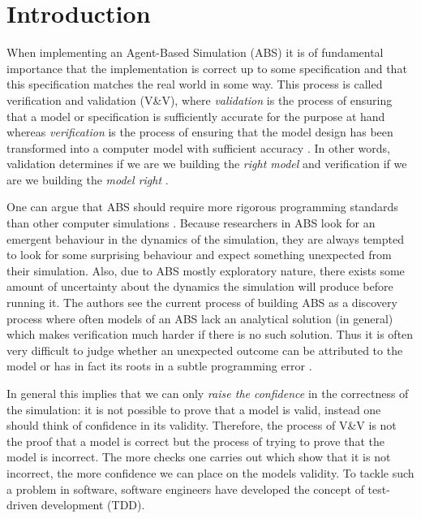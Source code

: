 \section{Introduction}
When implementing an Agent-Based Simulation (ABS) it is of fundamental importance that the implementation is correct up to some specification and that this specification matches the real world in some way. This process is called verification and validation (V\&V), where \textit{validation} is the process of ensuring that a model or specification is sufficiently accurate for the purpose at hand whereas \textit{verification} is the process of ensuring that the model design has been transformed into a computer model with sufficient accuracy \cite{robinson_simulation:_2014}. In other words, validation determines if we are we building the \textit{right model} and verification if we are we building the \textit{model right} \cite{balci_verification_1998}.

One can argue that ABS should require more rigorous programming standards than other computer simulations \cite{polhill_ghost_2005}. Because researchers in ABS look for an emergent behaviour in the dynamics of the simulation, they are always tempted to look for some surprising behaviour and expect something unexpected from their simulation. 
Also, due to ABS mostly exploratory nature, there exists some amount of uncertainty about the dynamics the simulation will produce before running it. The authors \cite{ormerod_validation_2006} see the current process of building ABS as a discovery process where often models of an ABS lack an analytical solution (in general) which makes verification much harder if there is no such solution. Thus it is often very difficult to judge whether an unexpected outcome can be attributed to the model or has in fact its roots in a subtle programming error \cite{galan_errors_2009}.

In general this implies that we can only \textit{raise the confidence} in the correctness of the simulation: it is not possible to prove that a model is valid, instead one should think of confidence in its validity. Therefore, the process of V\&V is not the proof that a model is correct but the process of trying to prove that the model is incorrect. The more checks one carries out which show that it is not incorrect, the more confidence we can place on the models validity. To tackle such a problem in software, software engineers have developed the concept of test-driven development (TDD).

